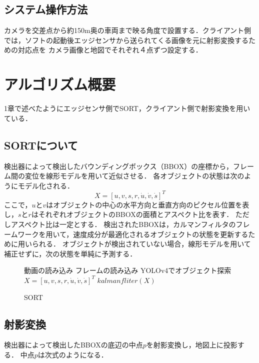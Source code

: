 \documentclass[technicalreport]{ieicej}
\begin{document}
\subsection{システム操作方法}
カメラを交差点から約150m奥の車両まで映る角度で設置する．クライアント側では，ソフトの起動後エッジセンサから送られてくる画像を元に射影変換するための対応点を
カメラ画像と地図でそれぞれ４点ずつ設定する．

\section{アルゴリズム概要}
1章で述べたようにエッジセンサ側でSORT，クライアント側で射影変換を用いている．

\subsection{SORTについて}
検出器によって検出したバウンディングボックス（BBOX）の座標から，フレーム間の変位を線形モデルを用いて近似させる．
各オブジェクトの状態は次のようにモデル化される．
\begin{equation}
  X = [u, v, s, r, \dot{u} , \dot{v} , \dot{s}]^T
\end{equation}
ここで，$u$と$v$はオブジェクトの中心の水平方向と垂直方向のピクセル位置を表し，$s$と$r$はそれぞれオブジェクトのBBOXの面積とアスペクト比を表す．
ただしアスペクト比は一定とする．
検出されたBBOXは，カルマンフィルタのフレームワークを用いて，速度成分が最適化されるオブジェクトの状態を更新するために用いられる．
オブジェクトが検出されていない場合，線形モデルを用いて補正せずに，次の状態を単純に予測する．

\begin{figure}[!t]
  \begin{algorithm}[H]
      \caption{SORT}
      \label{alg1}
      \begin{algorithmic}[1]
      \STATE 動画の読み込み
      \WHILE{}
      \STATE フレームの読み込み
      \STATE YOLOv4でオブジェクト探索
      \STATE $X = [u, v, s, r, \dot{u} , \dot{v} , \dot{s}]^T$ 
      \STATE $kalmanfliter(X)$
      \ENDIF
      \ENDWHILE
      \end{algorithmic}
  \end{algorithm}
  \end{figure}

\subsection{射影変換}
検出器によって検出したBBOXの底辺の中点$p$を射影変換し，地図上に投影する．
中点$p$は次式のようになる．
\end{document}
